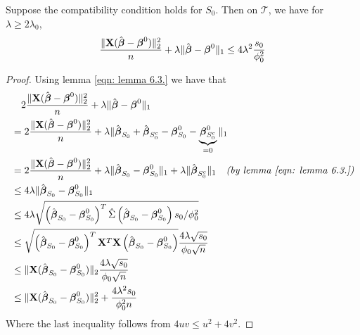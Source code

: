 \begin{theorem}[Theorem 6.1.]
    Suppose the compatibility condition holds for $S_{0}$. Then on $\mathscr{T}$, we have for $\lambda \geq 2 \lambda_{0}$,
    $$
        \frac{\|\mathbf{X}(\hat{\boldsymbol{\beta}}-\boldsymbol{\beta}^{0})\|_{2}^{2}}{n}+\lambda\|\hat{\boldsymbol{\beta}}-\boldsymbol{\beta}^{0}\|_{1} \leq 4 \lambda^{2} \frac{s_{0}}{\phi_{0}^{2}}
    $$
\end{theorem}
\begin{proof}
    Using lemma \ref{eqn: lemma 6.3.} we have that
    \begin{align*}
         & \quad 2 \frac{\|\mathbf{X}(\hat{\boldsymbol{\beta}}-\boldsymbol{\beta}^{0})\|_{2}^{2}}{n} + \lambda\|\hat{\boldsymbol{\beta}}-\boldsymbol{\beta}^{0}\|_{1}                                                                                                       \\
         & = 2 \frac{\|\mathbf{X}(\hat{\boldsymbol{\beta}}-\boldsymbol{\beta}^{0})\|_{2}^{2}}{n} + \lambda \| \hat{\boldsymbol{\beta}}_{S_0} + \hat{\boldsymbol{\beta}}_{S_{0}^{c}} - \boldsymbol{\beta}^{0}_{S_0} - \underbrace{\boldsymbol{\beta}^{0}_{S_0^c}}_{=0} \|_{1}                            \\
         & = 2 \frac{\|\mathbf{X}(\hat{\boldsymbol{\beta}}-\boldsymbol{\beta}^{0})\|_{2}^{2}}{n} + \lambda \| \hat{\boldsymbol{\beta}}_{S_0} - \boldsymbol{\beta}^{0}_{S_0} \|_{1} + \lambda \| \hat{\boldsymbol{\beta}}_{S_{0}^{c}} \|_1 \quad \textit{(by lemma \ref{eqn: lemma 6.3.})} \\
         & \leq 4 \lambda \|\hat{\boldsymbol{\beta}}_{S_{0}} - \boldsymbol{\beta}_{S_{0}}^{0} \|_{1}                                                                                                                                            \\
         & \leq 4 \lambda \sqrt{\left( \hat{\boldsymbol{\beta}}_{S_{0}} - \boldsymbol{\beta}_{S_{0}}^{0} \right)^{T} \hat{\Sigma} \left( \hat{\boldsymbol{\beta}}_{S_{0}} - \boldsymbol{\beta}_{S_{0}}^{0}  \right) s_{0} / \phi_{0}^{2}}                                   \\
         & \leq \sqrt{\left( \hat{\boldsymbol{\beta}}_{S_{0}} - \boldsymbol{\beta}_{S_{0}}^{0} \right)^{T} \mathbf{X}^T \mathbf{X} \left( \hat{\boldsymbol{\beta}}_{S_{0}} - \boldsymbol{\beta}_{S_{0}}^{0}  \right)} \frac{4 \lambda \sqrt{s_{0}}}{\phi_{0} \sqrt{n}}                      \\
         & \leq \| \mathbf{X} ( \hat{\boldsymbol{\beta}}_{S_{0}} - \boldsymbol{\beta}_{S_{0}}^{0} ) \|_2 \frac{4 \lambda \sqrt{s_{0}}}{\phi_{0} \sqrt{n}}                                                                                               \\
         & \leq \| \mathbf{X} ( \hat{\boldsymbol{\beta}}_{S_{0}} - \boldsymbol{\beta}_{S_{0}}^{0} ) \|^2_2 + \frac{4 \lambda^2 s_{0}}{\phi^2_{0} n}                                                                                                     \\
    \end{align*}
    Where the last inequality follows from $4uv \leq u^2 + 4v^2$.
\end{proof}


